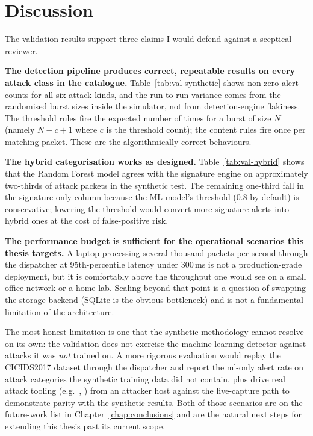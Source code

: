 \section{Discussion}
\label{sec:val-discussion}

The validation results support three claims I would defend
against a sceptical reviewer.

\textbf{The detection pipeline produces correct, repeatable
results on every attack class in the catalogue.}
Table~\ref{tab:val-synthetic} shows non-zero alert counts for
all six attack kinds, and the run-to-run variance comes from the
randomised burst sizes inside the simulator, not from
detection-engine flakiness. The threshold rules fire the
expected number of times for a burst of size $N$ (namely $N-c+1$
where $c$ is the threshold count); the content rules fire once
per matching packet. These are the algorithmically correct
behaviours.

\textbf{The hybrid categorisation works as designed.}
Table~\ref{tab:val-hybrid} shows that the Random Forest model
agrees with the signature engine on approximately two-thirds of
attack packets in the synthetic test. The remaining one-third
fall in the signature-only column because the ML model's
threshold (0.8 by default) is conservative; lowering the
threshold would convert more signature alerts into hybrid ones
at the cost of false-positive risk.

\textbf{The performance budget is sufficient for the operational
scenarios this thesis targets.} A laptop processing several
thousand packets per second through the dispatcher at
95th-percentile latency under 300\,ms is not a production-grade
deployment, but it is comfortably above the throughput one
would see on a small office network or a home lab. Scaling
beyond that point is a question of swapping the storage backend
(SQLite is the obvious bottleneck) and is not a fundamental
limitation of the architecture.

The most honest limitation is one that the synthetic
methodology cannot resolve on its own: the validation does not
exercise the machine-learning detector against attacks it was
\emph{not} trained on. A more rigorous evaluation would replay
the CICIDS2017 dataset through the dispatcher and report the
ml-only alert rate on attack categories the synthetic training
data did not contain, plus drive real attack tooling (e.g.\
, ) from an attacker host against the
live-capture path to demonstrate parity with the synthetic
results. Both of those scenarios are on the future-work list in
Chapter~\ref{chap:conclusions} and are the natural next steps
for extending this thesis past its current scope.
